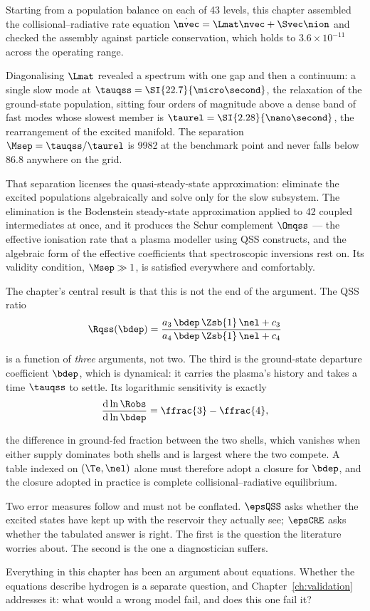 Starting from a population balance on each of 43 levels, this chapter assembled
the collisional--radiative rate equation $\dot{\nvec} = \Lmat\nvec + \Svec\nion$
and checked the assembly against particle conservation, which holds to
$3.6\times10^{-11}$ across the operating range.

Diagonalising $\Lmat$ revealed a spectrum with one gap and then a continuum: a
single slow mode at $\tauqss = \SI{22.7}{\micro\second}$, the relaxation of the
ground-state population, sitting four orders of magnitude above a dense band of
fast modes whose slowest member is $\taurel = \SI{2.28}{\nano\second}$, the
rearrangement of the excited manifold. The separation
$\Msep = \tauqss/\taurel$ is 9982 at the benchmark point and never falls below
$86.8$ anywhere on the grid.

That separation licenses the quasi-steady-state approximation: eliminate the
excited populations algebraically and solve only for the slow subsystem. The
elimination is the Bodenstein steady-state approximation applied to 42 coupled
intermediates at once, and it produces the Schur complement $\Omqss$ --- the
effective ionisation rate that a plasma modeller using QSS constructs, and the
algebraic form of the effective coefficients that spectroscopic inversions rest
on. Its validity condition, $\Msep \gg 1$, is satisfied everywhere and
comfortably.

The chapter's central result is that this is not the end of the argument. The
QSS ratio
\begin{equation*}
  \Rqss(\bdep) = \frac{a_3\,\bdep\,\Zsb{1}\,\nel + c_3}
                      {a_4\,\bdep\,\Zsb{1}\,\nel + c_4}
\end{equation*}

\noindent is a function of \emph{three} arguments, not two. The third is the
ground-state departure coefficient $\bdep$, which is dynamical: it carries the
plasma's history and takes a time $\tauqss$ to settle. Its logarithmic
sensitivity is exactly
\begin{equation*}
  \frac{\mathrm{d}\ln\Robs}{\mathrm{d}\ln\bdep} = \ffrac{3} - \ffrac{4},
\end{equation*}

\noindent the difference in ground-fed fraction between the two shells, which
vanishes when either supply dominates both shells and is largest where the two
compete. A table indexed on $(\Te,\nel)$ alone must therefore adopt a closure for
$\bdep$, and the closure adopted in practice is complete collisional--radiative
equilibrium.

Two error measures follow and must not be conflated. $\epsQSS$ asks whether the
excited states have kept up with the reservoir they actually see; $\epsCRE$ asks
whether the tabulated answer is right. The first is the question the literature
worries about. The second is the one a diagnostician suffers.

Everything in this chapter has been an argument about equations. Whether the
equations describe hydrogen is a separate question, and Chapter~\ref{ch:validation}
addresses it: what would a wrong model fail, and does this one fail it?
